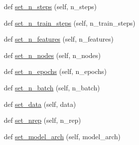 \begin{DoxyCompactItemize}
\item 
def \hyperlink{classsimulator_1_1Simulator_a0d6a95bda569d042c1d762f59af562b5}{set\+\_\+n\+\_\+steps} (self, n\+\_\+steps)
\item 
def \hyperlink{classsimulator_1_1Simulator_af88917d7bc1833f4fdbcbb57bc0c9de6}{set\+\_\+n\+\_\+train\+\_\+steps} (self, n\+\_\+train\+\_\+steps)
\item 
def \hyperlink{classsimulator_1_1Simulator_ae2a1a2f8db9633c2aed2dd4d62b77612}{set\+\_\+n\+\_\+features} (self, n\+\_\+features)
\item 
def \hyperlink{classsimulator_1_1Simulator_a324de43e915761d93a5aa08f7c013a22}{set\+\_\+n\+\_\+nodes} (self, n\+\_\+nodes)
\item 
def \hyperlink{classsimulator_1_1Simulator_a593b40c681ffdf64d3c183b6bfaea04f}{set\+\_\+n\+\_\+epochs} (self, n\+\_\+epochs)
\item 
def \hyperlink{classsimulator_1_1Simulator_a2d17c0bee07f7fe69798d1ca6fec25f2}{set\+\_\+n\+\_\+batch} (self, n\+\_\+batch)
\item 
def \hyperlink{classsimulator_1_1Simulator_a10aa1b00ed1ca52092b6d9c981260504}{set\+\_\+data} (self, data)
\item 
def \hyperlink{classsimulator_1_1Simulator_a29a214d80621ba7325bbb834d13f25c3}{set\+\_\+nrep} (self, n\+\_\+rep)
\item 
def \hyperlink{classsimulator_1_1Simulator_aacf67f1375064e16a9384b5716b95e56}{set\+\_\+model\+\_\+arch} (self, model\+\_\+arch)
\end{DoxyCompactItemize}
